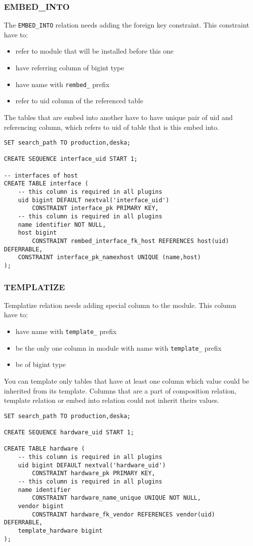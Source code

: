 \documentclass[deska]{subfiles}
\begin{document}
\subsubsection{EMBED\_INTO}
The {\tt EMBED\_INTO} relation needs adding the foreign key constraint. This constraint have to:
\begin{itemize}
    \item refer to module that will be installed before this one
    \item have referring column of bigint type
    \item have name with {\tt rembed\_} prefix
    \item refer to uid column of the referenced table
\end{itemize}
The tables that are embed into another have to have unique pair of uid and referencing column, which refers to uid of table that is this embed into.
\begin{verbatim}
SET search_path TO production,deska;

CREATE SEQUENCE interface_uid START 1;

-- interfaces of host
CREATE TABLE interface (
    -- this column is required in all plugins
    uid bigint DEFAULT nextval('interface_uid')
        CONSTRAINT interface_pk PRIMARY KEY,
    -- this column is required in all plugins
    name identifier NOT NULL,
    host bigint
        CONSTRAINT rembed_interface_fk_host REFERENCES host(uid) DEFERRABLE,
    CONSTRAINT interface_pk_namexhost UNIQUE (name,host)
);
\end{verbatim}


\subsubsection{TEMPLATIZE}
Templatize relation needs adding special column to the module. This column have to:
\begin{itemize}
    \item have name with {\tt template\_} prefix
    \item be the only one column in module with name with {\tt template\_} prefix
    \item be of bigint type
\end{itemize}
You can template only tables that have at least one column which value could be inherited from its template. Columns that are a part of composition relation, template relation or embed into relation could not inherit theirs values.

\begin{verbatim}
SET search_path TO production,deska;

CREATE SEQUENCE hardware_uid START 1;

CREATE TABLE hardware (
    -- this column is required in all plugins
    uid bigint DEFAULT nextval('hardware_uid')
        CONSTRAINT hardware_pk PRIMARY KEY,
    -- this column is required in all plugins
    name identifier
        CONSTRAINT hardware_name_unique UNIQUE NOT NULL,
    vendor bigint 
        CONSTRAINT hardware_fk_vendor REFERENCES vendor(uid) DEFERRABLE,
    template_hardware bigint
);
\end{verbatim}
\end{document}

